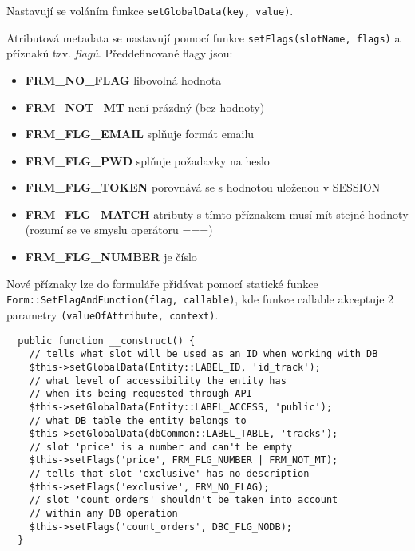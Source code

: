 \documentclass[12pt]{article}
\begin{document}
Nastavují se voláním funkce \texttt{setGlobalData(key, value)}.\newline

Atributová metadata se nastavují pomocí funkce \texttt{setFlags(slotName, flags)} a příznaků tzv. \emph{flagů}. Předdefinované flagy jsou:

\begin{itemize}
\item \textbf{FRM\_NO\_FLAG} libovolná hodnota
\item \textbf{FRM\_NOT\_MT} není prázdný (bez hodnoty)
\item \textbf{FRM\_FLG\_EMAIL} splňuje formát emailu
\item \textbf{FRM\_FLG\_PWD} splňuje požadavky na heslo
\item \textbf{FRM\_FLG\_TOKEN} porovnává se s hodnotou uloženou v SESSION
\item \textbf{FRM\_FLG\_MATCH} atributy s tímto příznakem musí mít stejné hodnoty (rozumí se ve smyslu operátoru ===)
\item \textbf{FRM\_FLG\_NUMBER} je číslo
\end{itemize}

Nové příznaky lze do formuláře přidávat pomocí statické funkce \texttt{Form::SetFlagAndFunction(flag, callable)}, kde funkce callable akceptuje 2 parametry \texttt{(valueOfAttribute, context)}.

\lstset{language=PHP}
\begin{lstlisting}
  public function __construct() {
    // tells what slot will be used as an ID when working with DB
    $this->setGlobalData(Entity::LABEL_ID, 'id_track');
    // what level of accessibility the entity has
    // when its being requested through API
    $this->setGlobalData(Entity::LABEL_ACCESS, 'public');
    // what DB table the entity belongs to
    $this->setGlobalData(dbCommon::LABEL_TABLE, 'tracks');
    // slot 'price' is a number and can't be empty
    $this->setFlags('price', FRM_FLG_NUMBER | FRM_NOT_MT);
    // tells that slot 'exclusive' has no description
    $this->setFlags('exclusive', FRM_NO_FLAG);
    // slot 'count_orders' shouldn't be taken into account
    // within any DB operation
    $this->setFlags('count_orders', DBC_FLG_NODB);
  }
\end{lstlisting}
\end{document}
